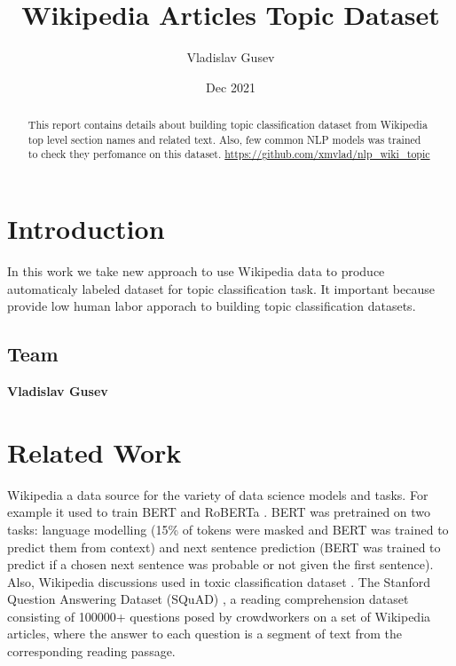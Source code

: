\documentclass{article}
\title{Wikipedia Articles Topic Dataset}
\author{Vladislav Gusev}
\date{Dec 2021}
\begin{document}
\maketitle
\begin{abstract}
    This report contains details about building topic classification dataset from Wikipedia top level section names and related text. Also, few common NLP models was trained to check they perfomance on this dataset.
    \url{https://github.com/xmvlad/nlp_wiki_topic}
\end{abstract}


\section{Introduction}
In this work we take new approach to use Wikipedia data to produce automaticaly labeled dataset for topic classification task. It important because provide low human labor apporach to building topic classification datasets. 

\subsection{Team}
\textbf{Vladislav Gusev}

\section{Related Work}
\label{sec:related}
Wikipedia a data source for the variety of data science models and tasks. For example it used to train BERT \cite{Devlin2018} and RoBERTa \cite{yinhan2019roberta}. 
BERT was pretrained on two tasks: language modelling (15\% of tokens were masked and BERT was trained to predict them from context) and next sentence prediction (BERT was trained to predict if a chosen next sentence was probable or not given the first sentence).
Also, Wikipedia discussions used in toxic classification dataset \cite{thain2017wikipedia}.
The Stanford Question Answering Dataset (SQuAD) \cite{rajpurkar2016squad}, a reading comprehension dataset consisting of 100000+ questions posed by crowdworkers on a set of Wikipedia articles, where the answer to each question is a segment of text from the corresponding reading passage.
\end{document}
